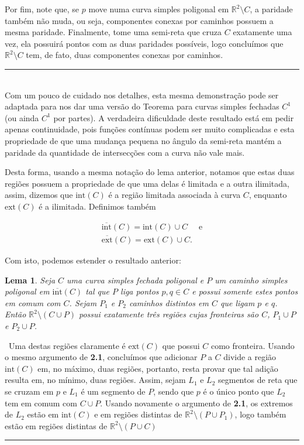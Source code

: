 \documentclass[12pt,a4paper]{article}
\newtheorem{lem}[mydef]{Lema}
\def\dem{\par\smallbreak\noindent {\textit{ Demonstração:}} \ }
\def\eop{\hfill\rule{2.5mm}{2.5mm} \\ }
\theoremstyle{definition}
\begin{document}
Por fim, note que, se $p$ move numa curva simples poligonal em $\mathbb{R}^2\setminus C$, a paridade também não muda, ou seja, componentes conexas por caminhos possuem a mesma paridade. Finalmente, tome uma semi-reta que cruza $C$ exatamente uma vez, ela possuirá pontos com as duas paridades possíveis, logo concluímos que $\mathbb{R}^2\setminus C$ tem, de fato, duas componentes conexas por caminhos. \eop

Com um pouco de cuidado nos detalhes, esta mesma demonstração pode ser adaptada para nos dar uma versão do Teorema para curvas simples fechadas $C^1$ (ou ainda $C^1$ por partes). A verdadeira dificuldade deste resultado está em pedir apenas continuidade, pois funções contínuas podem ser muito complicadas e esta propriedade de que uma mudança pequena no ângulo da semi-reta mantém a paridade da quantidade de intersecções com a curva não vale mais. 

Desta forma, usando a mesma notação do lema anterior, notamos que estas duas regiões possuem a propriedade de que uma delas é limitada e a outra ilimitada, assim, dizemos que $\text{int}(C)$ é a região limitada associada à curva $C$, enquanto  $\text{ext}(C)$ é a ilimitada. Definimos também

$$\begin{array}{cc}
   \overline{\text{int}}(C) = \text{int}(C)\cup C &  \text{e} \\
    \overline{\text{ext}}(C) = \text{ext}(C)\cup C. &
\end{array}$$

Com isto, podemos estender o resultado anterior:

\begin{lem}

    Seja $C$ uma curva simples fechada poligonal e $P$ um caminho simples poligonal em $\overline{\text{int}}(C)$ tal que $P$ liga pontos $p,q\in C$ e possui somente estes pontos em comum com $C$. Sejam $P_1$ e $P_2$ caminhos distintos em $C$ que ligam $p$ e $q$. Então $\mathbb{R}^2\setminus (C\cup P)$ possui exatamente três regiões cujas fronteiras são $C$, $P_1\cup P$ e $P_2\cup P$. 

\end{lem}

\dem Uma destas regiões claramente é $\text{ext}(C)$ que possui $C$ como fronteira. Usando o mesmo argumento de \textbf{2.1}, concluímos que adicionar $P$ a $C$ divide a região $\text{int}(C)$ em, no máximo, duas regiões, portanto, resta provar que tal adição resulta em, no mínimo, duas regiões. Assim, sejam $L_1$ e $L_2$ segmentos de reta que se cruzam em $p$ e $L_1$ é um segmento de $P$, sendo que $p$ é o único ponto que $L_2$ tem em comum com $C\cup P$. Usando novamente o argumento de \textbf{2.1}, os extremos de $L_2$ estão em $\text{int}(C)$ e em regiões distintas de $\mathbb{R}^2\setminus (P\cup P_1)$, logo também estão em regiões distintas de $\mathbb{R}^2\setminus (P\cup C)$\ \eop
\end{document}
